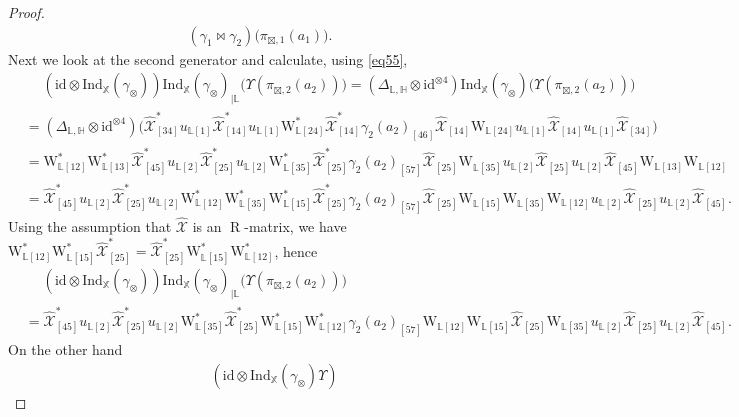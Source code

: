 \documentclass[reqno]{amsart}
\numberwithin{equation}{section}
\newcommand{\id}{\mathrm{id}}
\newcommand{\Ll}{\mathbb{L}}
\newcommand{\X}{\mathbb{X}}
\newcommand{\Ind}{\mathrm{Ind}}
\newcommand{\mc}{\mathcal}
\newcommand{\wh}{\widehat}
\newcommand{\HH}{\mathbb{H}}
\newcommand{\ww}{\mathrm{W}}
\begin{document}
\begin{proof}
\begin{equation}
\begin{split}
(\gamma_1\bowtie \gamma_2)
\bigl(\pi_{\boxtimes,1}(a_1) \bigr).
\end{split}\end{equation}
Next we look at the second generator and calculate, using \eqref{eq55},
\[\begin{split}
&\quad\;
(\id\otimes \Ind_{\X}(\gamma_\otimes))
\Ind_{\X}(\gamma_\otimes)_{|\mathbb{L}}
\bigl(\Upsilon(\pi_{\boxtimes,2}(a_2)) \bigr)=
(\Delta_{\mathbb{L},\HH}\otimes \id^{\otimes 4})
\Ind_{\X}(\gamma_\otimes)
\bigl(\Upsilon(\pi_{\boxtimes,2}(a_2)) \bigr)\\
&=
(\Delta_{\mathbb{L},\HH}\otimes \id^{\otimes 4})\bigl(
\wh{\mc{X}}^*_{[34]}u_{\Ll [1]}
\wh{\mc{X}}^*_{[14]}u_{\Ll [1]}
\ww^*_{\Ll [24]}\wh{\mc{X}}^*_{[14]}
\gamma_2(a_2)_{[46]}
\wh{\mc{X}}_{[14]}
\ww_{\Ll [24]}
u_{\Ll [1]}
\wh{\mc{X}}_{[14]}u_{\Ll [1]}
\wh{\mc{X}}_{[34]}
\bigr)\\
&=
\ww_{\mathbb{L} [12]}^*\ww_{\mathbb{L} [13]}^*\wh{\mc{X}}^*_{[45]}u_{\Ll [2]}
\wh{\mc{X}}^*_{[25]}u_{\Ll [2]}
\ww^*_{\Ll [35]}\wh{\mc{X}}^*_{[25]}
\gamma_2(a_2)_{[57]}
\wh{\mc{X}}_{[25]}
\ww_{\Ll [35]}
u_{\Ll [2]}
\wh{\mc{X}}_{[25]}u_{\Ll [2]}
\wh{\mc{X}}_{[45]}
\ww_{\mathbb{L} [13]}\ww_{\mathbb{L} [12]}\\
&=
\wh{\mc{X}}^*_{[45]}
u_{\Ll [2]}
\wh{\mc{X}}^*_{[25]}u_{\Ll [2]}
\ww_{\mathbb{L} [12]}^*
\ww^*_{\mathbb{L} [35]}\ww^*_{\mathbb{L} [15]}
\wh{\mc{X}}^*_{[25]}
\gamma_2(a_2)_{[57]}
\wh{\mc{X}}_{[25]}
\ww_{\mathbb{L} [15]}
\ww_{\mathbb{L} [35]}
\ww_{\mathbb{L} [12]}
u_{\Ll [2]}
\wh{\mc{X}}_{[25]}u_{\Ll [2]}
\wh{\mc{X}}_{[45]}.
\end{split}\]
Using the assumption that $\wh{\mc{X}}$ is an $\operatorname{R}$-matrix, we have $
\ww^*_{\mathbb{L} [12]} \ww^*_{\mathbb{L} [15]}
\wh{\mc{X}}^*_{[25]}=
\wh{\mc{X}}_{[25]}^*
\ww_{\mathbb{L} [15]}^*
\ww_{\mathbb{L} [12]}^*$, hence
\[\begin{split}
&\quad\;
(\id\otimes \Ind_{\X}(\gamma_\otimes))
\Ind_{\X}(\gamma_\otimes)_{|\mathbb{L}}
\bigl(\Upsilon(\pi_{\boxtimes,2}(a_2)) \bigr)\\
&=
\wh{\mc{X}}^*_{[45]}
u_{\Ll [2]}
\wh{\mc{X}}^*_{[25]}u_{\Ll [2]}
\ww^*_{\mathbb{L} [35]}
\wh{\mc{X}}^*_{[25]}
\ww^*_{\mathbb{L} [15]}
\ww_{\mathbb{L} [12]}^*
\gamma_2(a_2)_{[57]}
\ww_{\mathbb{L} [12]}
\ww_{\mathbb{L} [15]}
\wh{\mc{X}}_{[25]}
\ww_{\mathbb{L} [35]}
u_{\Ll [2]}
\wh{\mc{X}}_{[25]}u_{\Ll [2]}
\wh{\mc{X}}_{[45]}.
\end{split}\]
On the other hand
\[\begin{split}
&\quad\;
(\id\otimes \Ind_{\X}(\gamma_\otimes)\Upsilon)

\end{split}\]
\end{proof}
\end{document}
